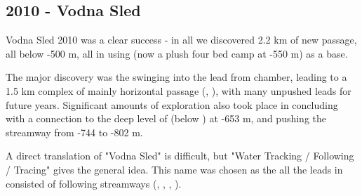\begin{tcolorbox}
\chapter{2010 - Vodna Sled}

Vodna Sled 2010 was a clear success - in all we discovered 2.2 km of new
passage, all below -500 m, all in  using  (now a plush four bed camp at -550 m) as a base.

The major discovery was the swinging into the  lead from
 chamber, leading to a 1.5 km complex of mainly horizontal
passage (, ), with many
unpushed leads for future years. Significant amounts of exploration also
took place in  concluding with a connection to
the deep level of  (below ) at -653 m,
and pushing the  streamway from -744 to -802 m.

A direct translation of "Vodna Sled" is difficult, but "Water Tracking / Following / Tracing" gives the general idea. This name was chosen as the all the leads in  consisted of following streamways (, , , ).


\end{tcolorbox}
\BgThispage









